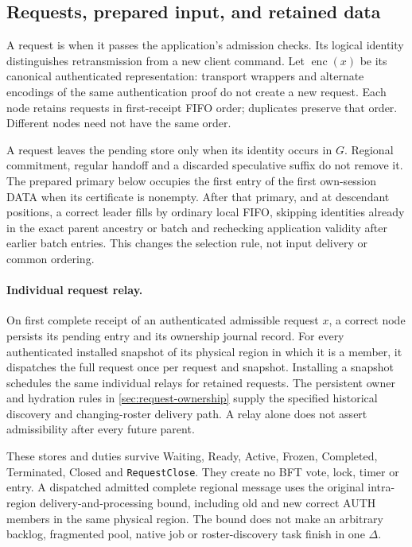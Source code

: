\subsection{Requests, prepared input, and retained data}
\label{sec:requests}
A request is  when it passes the application's admission
checks. Its logical identity distinguishes retransmission from a new
client command. Let $\operatorname{enc}(x)$ be its canonical authenticated
representation: transport wrappers and alternate encodings of the same
authentication proof do not create a new request. Each node retains
requests in first-receipt FIFO order; duplicates preserve that order.
Different nodes need not have the same order.

A request leaves the pending store only when its identity occurs in $G$.
Regional commitment, regular handoff and a discarded speculative suffix
do not remove it. The prepared primary below occupies the first entry of
the first own-session DATA when its certificate is nonempty. After that
primary, and at descendant positions, a correct leader fills by ordinary
local FIFO, skipping identities already in the exact parent ancestry or
batch and rechecking application validity after earlier batch entries.
This changes the selection rule, not input delivery or common ordering.

\paragraph{Individual request relay.}
On first complete receipt of an authenticated admissible request $x$, a
correct node persists its pending entry and its ownership journal record.
For every authenticated installed snapshot of its physical region in
which it is a member, it dispatches the full request once per request and
snapshot. Installing a snapshot schedules the same individual relays for
retained requests. The persistent owner and hydration rules in
\cref{sec:request-ownership} supply the specified historical discovery
and changing-roster delivery path. A relay alone does not assert
admissibility after every future parent.

These stores and duties survive Waiting, Ready, Active, Frozen, Completed,
Terminated, Closed and \texttt{RequestClose}. They create no BFT vote,
lock, timer or entry. A dispatched admitted complete regional message
uses the original intra-region delivery-and-processing bound, including
old and new correct AUTH members in the same physical region. The bound
does not make an arbitrary backlog, fragmented pool, native job or
roster-discovery task finish in one $\Delta$.

